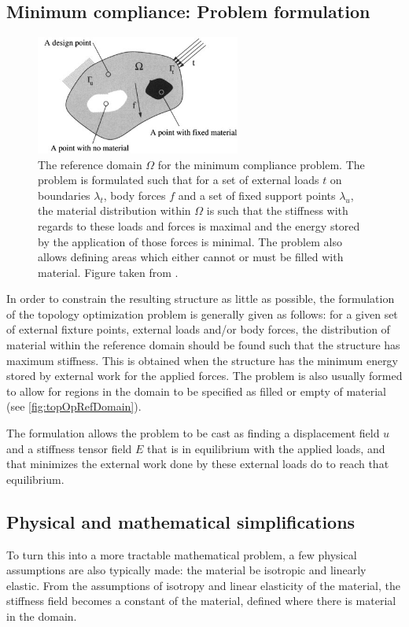 \subsection{Minimum compliance: Problem formulation}
\label{subsec:TopOpTheory}
\begin{figure}
\centering
\includegraphics[width=0.6\textwidth]{Pictures/TopOp/design_domain.png}
\caption{The reference domain $\Omega$ for the minimum compliance problem. The problem is formulated such that for a set of external loads $t$ on boundaries $\lambda_t$, body forces $f$ and a set of fixed support points $\lambda_u$, the material distribution within $\Omega$ is such that the stiffness with regards to these loads and forces is maximal and the energy stored by the application of those forces is minimal. The problem also allows defining areas which either cannot or must be filled with material. Figure taken from \cite{bendsoe2003topology}.}
\label{fig:topOpRefDomain}
\end{figure}
In order to constrain the resulting structure as little as possible, the formulation of the topology optimization problem is generally given as follows: for a given set of external fixture points, external loads and/or body forces, the distribution of material within the reference domain should be found such that the structure has maximum stiffness. This is obtained when the structure has the minimum energy stored by external work for the applied forces. The problem is also usually formed to allow for regions in the domain to be specified as filled or empty of material (see \autoref{fig:topOpRefDomain}). 

The formulation allows the problem to be cast as finding a displacement field $u$ and a stiffness tensor field $E$ that is in equilibrium with the applied loads, and that minimizes the external work done by these external loads do to reach that equilibrium. 

\subsection{Physical and mathematical simplifications}
To turn this into a more tractable mathematical problem, a few physical assumptions are also typically made: the material be isotropic and linearly elastic. From the assumptions of isotropy and linear elasticity of the material, the stiffness field becomes a constant of the material, defined where there is material in the domain.

